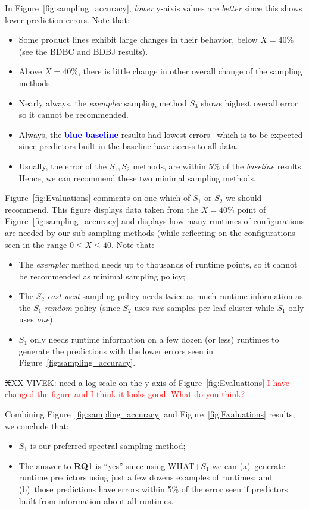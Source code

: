 \documentclass{sig-alternative}
\newcommand{\bi}{\begin{itemize}}%
\newcommand{\ei}{\end{itemize}}
\newcommand{\fig}[1]{Figure~\ref{fig:#1}}
\begin{document}
In  \fig{sampling_accuracy}, {\em lower} y-aixis values are {\em better} since this shows lower
prediction errors. Note that:
\begin{itemize}

\item Some product lines exhibit large changes in their behavior, below $X=40$\% (see the BDBC and BDBJ
results).
\item Above $X=40$\%, there is little change in other overall change of the sampling methods.
\item
Nearly always, the {\em exempler} sampling method $S_3$ shows  highest overall error 
so it cannot be recommended.
\item Always, the  \textcolor{blue}{{\bf blue baseline}} results  had lowest errors-- which is to be
expected since predictors built in the baseline have access to all data.
\item
Usually, the error of the $S_1,S_2$ methods, are within $5$\% of the {\em baseline} results.
Hence, we can recommend these two minimal sampling methods.
\end{itemize}
\fig{Evaluations} comments on one which  of    $S_1$ or $S_2$ we should recommend.
This figure displays data taken from the $X=40$\% point of \fig{sampling_accuracy} and displays
how many runtimes of configurations are needed by our sub-sampling methods (while
reflecting on the configurations seen in the range $0\le X \le 40$. Note that:
\bi
\item
The {\em exemplar} method needs up to thousands of runtime points, 
so it cannot be recommended as
minimal sampling
policy;
\item The $S_2$ {\em east-west} sampling policy needs twice as much runtime information as 
the $S_1$ {\em random} policy (since $S_2$ uses {\em two} samples per leaf cluster  while
$S_1$ only uses {\em one}).
\item $S_1$ only needs runtime information on a few dozen (or less) runtimes to generate
the predictions with the lower errors seen in \fig{sampling_accuracy}.
\ei
{\st XXX VIVEK: need a log scale on the y-axis of \fig{Evaluations} } 
\textcolor{red}{I have changed the figure and I think it looks good. What do you think?}

Combining \fig{sampling_accuracy} and \fig{Evaluations} results, we conclude that:
\bi
\item
$S_1$ is our preferred spectral sampling method;
\item
The answer to {\bf RQ1} is ``yes'' since using WHAT+$S_1$ we can (a)~generate runtime predictors
using just a few dozens examples of runtimes; and (b)~those predictions have errors
within 5\% of the error seen if predictors built from information about all runtimes.
\ei
\end{document}
